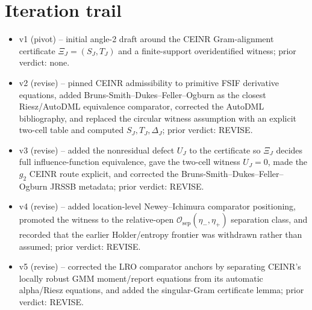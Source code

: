 \documentclass[11pt]{article}
\theoremstyle{definition}
\theoremstyle{plain}
\theoremstyle{remark}
\begin{document}
\section{Iteration trail}
\begin{itemize}[leftmargin=*]
\item v1 (pivot) -- initial angle-2 draft around the CEINR Gram-alignment
certificate \(\Xi_J=(S_J,T_J)\) and a finite-support overidentified witness;
prior verdict: none.
\item v2 (revise) -- pinned CEINR admissibility to primitive FSIF derivative
equations, added Bruns-Smith--Dukes--Feller--Ogburn as the closest
Riesz/AutoDML equivalence comparator, corrected the AutoDML bibliography, and
replaced the circular witness assumption with an explicit two-cell table and
computed \(S_J,T_J,\Delta_J\); prior verdict: REVISE.
\item v3 (revise) -- added the nonresidual defect \(U_J\) to the certificate so
\(\Xi_J\) decides full influence-function equivalence, gave the two-cell
witness \(U_J=0\), made the \(g_2\) CEINR route explicit, and corrected the
Bruns-Smith--Dukes--Feller--Ogburn JRSSB metadata; prior verdict: REVISE.
\item v4 (revise) -- added location-level Newey--Ichimura comparator
positioning, promoted the witness to the relative-open
\(\mathcal O_{\mathrm{sep}}(\eta_-,\eta_+)\) separation class, and recorded that
the earlier Holder/entropy frontier was withdrawn rather than assumed; prior
verdict: REVISE.
\item v5 (revise) -- corrected the LRO comparator anchors by separating
CEINR's locally robust GMM moment/report equations from its automatic
alpha/Riesz equations, and added the singular-Gram certificate lemma; prior
verdict: REVISE.
\end{itemize}
\end{document}
